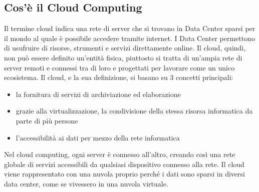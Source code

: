 \subsection{Cos’è il Cloud Computing} 
Il termine cloud indica una rete di server che si trovano in Data Center sparsi per il mondo al quale è possibile accedere tramite internet. I Data Center permettono di usufruire di risorse, strumenti e servizi direttamente online.  Il cloud, quindi, non può essere definito un’entità fisica, piuttosto si tratta di un’ampia rete di server remoti e connessi tra di loro e progettati per lavorare come un unico ecosistema. 
Il cloud, e la sua definizione, si basano su 3 concetti principali:
\begin{itemize}
    \item la fornitura di servizi di archiviazione ed elaborazione
    \item grazie alla virtualizzazione, la condivisione della stessa risorsa informatica da parte di più persone
    \item l’accessibilità ai dati per mezzo della rete informatica
\end{itemize}
Nel cloud computing, ogni server è connesso all’altro, creando così una rete globale di servizi accessibili da qualsiasi dispositivo connesso alla rete. Il cloud viene rappresentato con una nuvola proprio perché i dati sono sparsi in diversi data center, come se vivessero in una nuvola virtuale.
